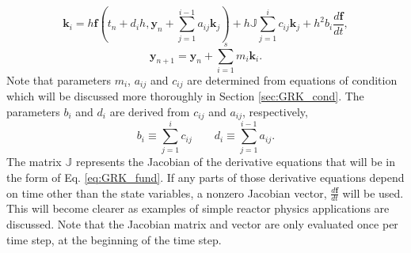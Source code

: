 \documentclass{ansconf}
\numberwithin{equation}{section}
\begin{document}
\begin{equation} \label{eq:GRK_nonauto}
    \mathbf{k}_{i} = h\mathbf{f} \left(t_n + d_ih,\mathbf{y}_n + \sum_{j=1}^{i-1}a_{ij}\mathbf{k}_{j}\right) 
                                + h\mathbb{J}\sum_{j=1}^i c_{ij}\mathbf{k}_{j}  + h^2b_i\frac{d\mathbf{f}}{dt},
\end{equation}
\begin{equation}
    \mathbf{y}_{n+1} = \mathbf{y}_{n} + \sum_{i=1}^s m_i\mathbf{k}_i.
\end{equation}
Note that parameters $m_i$, $a_{ij}$ and $c_{ij}$ are determined from equations of condition which will be discussed more thoroughly in Section \ref{sec:GRK_cond}. The parameters $b_i$ and $d_i$ are derived from $c_{ij}$ and $a_{ij}$, respectively,
\begin{equation}\label{eq:GRK_bd}
     b_i \equiv \sum_{j=1}^ic_{ij} \qquad d_i \equiv \sum_{j=1}^{i-1}a_{ij}.
\end{equation}
The matrix $\mathbb{J}$ represents the Jacobian of the derivative equations that will be in the form of Eq. \eqref{eq:GRK_fund}. If any parts of those derivative equations depend on time other than the state variables, a nonzero Jacobian vector, $\frac{d\mathbf{f}}{dt}$ will be used. This will become clearer as examples of simple reactor physics applications are discussed. Note that the Jacobian matrix and vector are only evaluated once per time step, at the beginning of the time step.

 \label{sec:GRK_cond}
\end{document}
